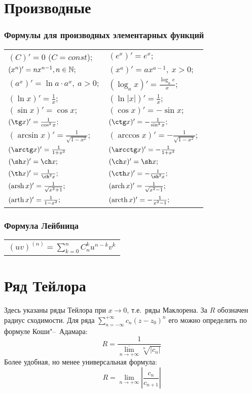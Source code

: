 \section{Производные}

\subsubsection{Формулы для производных элементарных функций}
\begin{longtable}[l]{l l}
$(C)'=0$ ($C=const$); 
&
$(e^x)'=e^x;$
\\
$(x^n)' = nx^{n-1}, n\in \mathbb{N};$
&
$(x^a)'=ax^{a-1},\ x>0;$
\\
$(a^x)'=\ln a\cdot a^x,\ a>0;$
&
$(\log_a x)'=\frac{\log_a e}{x};$%
\\
$(\ln x)' = \frac{1}{x};$%
&
$(\ln |x|)' = \frac{1}{x};$%
\\
$(\sin x)'=\cos x;$
&
$(\cos x)'=-\sin x;$
\\
$(\tg x)'= \frac{1}{\cos^2 x};$%
&
$(\ctg x)'= -\frac{1}{\sin^2 x};$ 
\\
$(\arcsin x)' = \frac{1}{\sqrt{1-x^2}};$
&
$(\arccos x)' = -\frac{1}{\sqrt{1-x^2}};$
\\
$(\arctg x)' = \frac{1}{1+x^2}$
&
$(\arcctg x)' = -\frac{1}{1+x^2}$
\\
$(\sh x)'= \ch x;$
&
$(\ch x)'= \sh x;$
\\
$(\th x)'= \frac{1}{\ch^2 x};$
&
$(\cth x)'= -\frac{1}{\sh^2 x};$
\\
$(\operatorname{arsh} x)'=\frac{1}{\sqrt{x^2+1}};$
&
$(\operatorname{arch} x)'=\frac{1}{\sqrt{x^2-1}};$
\\
$(\operatorname{arth} x)'=\frac{1}{1-x^2};$
&
$(\operatorname{arcth} x)'=-\frac{1}{x^2-1};$
\end{longtable}

\subsubsection{Формула Лейбница}
\begin{longtable}[l]{l}
$(uv)^{(n)}=\sum\limits^n_{k=0} C^k_n u^{n-k} v^{k}$
\end{longtable}

\section{Ряд Тейлора}

\begin{notion}
Здесь указаны ряды Тейлора при $x \to 0$, т.е.~ряды Маклорена. За $R$ обозначен радиус сходимости. Для ряда $\sum\limits_{n=-\infty}^{+\infty} c_n (z-z_0)^n $ его можно определить по формуле Коши"--~Адамара:
$$
R = \frac{1}{\overline{\lim\limits_{n \to + \infty}} \sqrt[n]{|c_n|}}
$$
Более удобная, но менее универсальная формула:$$
R = \lim\limits_{n \to + \infty} \left| \frac{c_n}{c_{n + 1}} \right|
$$
\end{notion}

